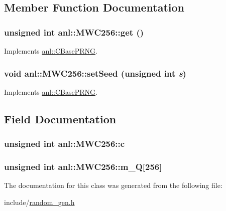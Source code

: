 \subsection{Member Function Documentation}
\hypertarget{classanl_1_1MWC256_a7857a5fc425c176743a88062aeddbedf}{
\subsubsection[{get}]{\setlength{\rightskip}{0pt plus 5cm}unsigned int anl::MWC256::get ()}}
\label{classanl_1_1MWC256_a7857a5fc425c176743a88062aeddbedf}


Implements \hyperlink{classanl_1_1CBasePRNG_a7a0fcd0d3c4b0f9f160835b4b254a1ed}{anl::CBasePRNG}.\hypertarget{classanl_1_1MWC256_a21991854d1538735f7f47746c5277697}{
\subsubsection[{setSeed}]{\setlength{\rightskip}{0pt plus 5cm}void anl::MWC256::setSeed (unsigned int {\em s})}}
\label{classanl_1_1MWC256_a21991854d1538735f7f47746c5277697}


Implements \hyperlink{classanl_1_1CBasePRNG_a6e9a81522fe055749739e4d79b5aa27e}{anl::CBasePRNG}.

\subsection{Field Documentation}
\hypertarget{classanl_1_1MWC256_a9072ebc5be10951ef6179cdfbbccd22a}{
\subsubsection[{c}]{\setlength{\rightskip}{0pt plus 5cm}unsigned int {\bf anl::MWC256::c}}}
\label{classanl_1_1MWC256_a9072ebc5be10951ef6179cdfbbccd22a}
\hypertarget{classanl_1_1MWC256_ad825932cee7866151d8237d13fcf6f5c}{
\subsubsection[{m\_\-Q}]{\setlength{\rightskip}{0pt plus 5cm}unsigned int {\bf anl::MWC256::m\_\-Q}\mbox{[}256\mbox{]}}}
\label{classanl_1_1MWC256_ad825932cee7866151d8237d13fcf6f5c}


The documentation for this class was generated from the following file:\begin{DoxyCompactItemize}
\item 
include/\hyperlink{random__gen_8h}{random\_\-gen.h}\end{DoxyCompactItemize}
